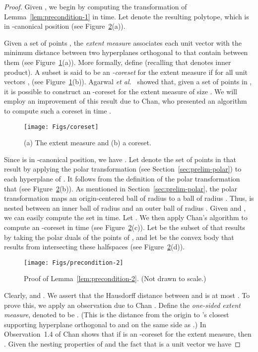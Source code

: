 \documentclass[11pt]{article}   \usepackage[letterpaper,hmargin=2.1cm,vmargin=3cm]{geometry}
\newcommand{\etal}{\textit{et al.}}
\begin{document}
\begin{proof}
Given , we begin by computing the transformation  of Lemma~\ref{lem:precondition-1} in  time. Let  denote the resulting polytope, which is in -canonical position (see Figure~\ref{fig:precondition-2}(a)).

Given a set  of points , the \emph{extent measure} associates each unit vector  with the minimum distance between two hyperplanes orthogonal to  that contain  between them (see Figure~\ref{fig:coreset}(a)). More formally, define  (recalling that  denotes inner product). A subset  is said to be an \emph{-coreset} for the extent measure if for all unit vectors ,  (see Figure~\ref{fig:coreset}(b)). Agarwal {\etal}~\cite{AHV-coreset} showed that, given a set of  points in , it is possible to construct an -coreset for the extent measure of size . We will employ an improvement of this result due to Chan, who presented an algorithm to compute such a coreset in  time \cite{Chan-coreset}.

\begin{figure}[htbp]
  \centerline{\texttt{[image: Figs/coreset]}}
  \caption{(a) The extent measure  and (b) a coreset.}
  \label{fig:coreset}
\end{figure}


Since  is in -canonical position, we have . Let  denote the set of  points in  that result by applying the polar transformation (see Section~\ref{sec:prelim-polar}) to each hyperplane of . It follows from the definition of the polar transformation that  (see Figure~\ref{fig:precondition-2}(b)). As mentioned in Section~\ref{sec:prelim-polar}, the polar transformation maps an origin-centered ball of radius  to a ball of radius . Thus,  is nested between an inner ball of radius  and an outer ball of radius . Given  and , we can easily compute the set  in  time. Let . We then apply Chan's algorithm to compute an -coreset  in time  (see Figure~\ref{fig:precondition-2}(c)). Let  be the subset of  that results by taking the polar duals of the points of , and let  be the convex body that results from intersecting these halfspaces (see Figure~\ref{fig:precondition-2}(d)).

\begin{figure}[htbp]
  \centerline{\texttt{[image: Figs/precondition-2]}}
  \caption{Proof of Lemma~\ref{lem:precondition-2}. (Not drawn to scale.)}
  \label{fig:precondition-2}
\end{figure}


Clearly,  and . We assert that the Hausdorff distance between  and  is at most . To prove this, we apply an observation due to Chan \cite{Chan-coreset}. Define the \emph{one-sided extent measure}, denoted  to be . (This is the distance from the origin to 's closest supporting hyperplane orthogonal to and on the same side as .) In Observation~{1.4} of \cite{Chan-coreset} Chan shows that if  is an -coreset for the extent measure, then . Given the nesting properties of  and the fact that  is a unit vector we have 


\end{proof}
\end{document}
